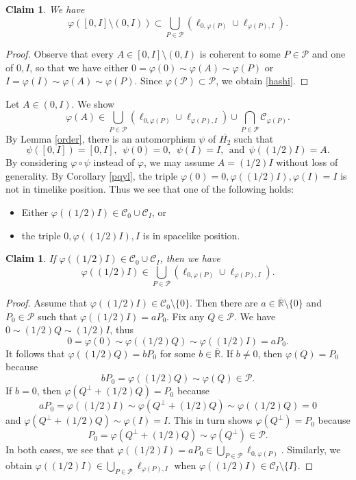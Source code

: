 \documentclass[10pt]{amsart}
\newtheorem{claim}[theorem]{Claim}
\theoremstyle{definition}
\theoremstyle{remark}
\numberwithin{subsection}{section}
\numberwithin{equation}{section}
\newcommand\cC{{\mathcal{C}}}
\newcommand\cP{{\mathcal{P}}}
\newcommand\oH{{\overline{H_2}}}
\newcommand\oR{{\overline{\mathbb{R}}}}
\begin{document}
\begin{claim}
We have
\begin{equation}\label{hashi}
\varphi([0, I]\setminus (0, I))\subset \bigcup_{P\in \cP}(\ell_{0, \varphi(P)}\cup\ell_{\varphi(P),I}).
\end{equation}
\end{claim}
\begin{proof}
Observe that every $A\in [0, I]\setminus (0, I)$ is coherent to some $P\in \cP$ and one of $0, I$, so that we have either $0=\varphi(0)\sim \varphi(A)\sim\varphi(P)$ or $I=\varphi(I)\sim \varphi(A)\sim\varphi(P)$.
Since $\varphi(\cP)\subset \cP$, we obtain \eqref{hashi}.
\end{proof}

Let $A\in (0, I)$. We show 
\[
\varphi(A)\in \bigcup_{P\in \cP}(\ell_{0, \varphi(P)}\cup\ell_{\varphi(P), I}) \cup \bigcap_{P\in \cP} \cC_{\varphi(P)}.
\] 
By Lemma \ref{order}, there is an automorphism $\psi$ of $\oH$ such that 
\[
\psi([0, I])=[0, I],\ \ \psi(0)=0,\ \ \psi(I)=I,\ \  \text{and}\ \ \psi((1/2)I)=A.
\] 
By considering $\varphi\circ\psi$ instead of $\varphi$, we may assume $A=(1/2)I$ without loss of generality.  
By Corollary \ref{pqyl}, the triple $\varphi(0)=0, \varphi((1/2)I), \varphi(I)=I$ is not in timelike position. 
Thus we see that one of the following holds: 
\begin{itemize}
\item Either $\varphi((1/2)I)\in \cC_0\cup \cC_I$, or
\item the triple $0, \varphi((1/2)I), I$ is in spacelike position. 
\end{itemize}


\begin{claim}
If $\varphi((1/2)I)\in \cC_0\cup \cC_I$, then we have
\[
\varphi((1/2)I)\in \bigcup_{P \in \mathcal{P}} \left( \ell_{0, \varphi (P)} \cup \ell_{\varphi (P), I}  \right).
\]
\end{claim}
\begin{proof}
Assume that  $\varphi((1/2)I)\in \cC_0\setminus \{0\}$. 
Then there are $a\in {\oR}\setminus \{0\}$ and $P_0\in \cP$ such that $\varphi((1/2)I)=aP_0$. 
Fix any $Q\in \cP$. 
We have $0\sim (1/2)Q\sim (1/2)I$, thus 
\[
0=\varphi(0)\sim \varphi((1/2)Q)\sim \varphi((1/2)I)=aP_0.
\] 
It follows that $\varphi((1/2)Q)=bP_0$ for some $b\in {\oR}$. 
If $b\neq 0$, then $\varphi(Q)=P_0$ because 
\[
bP_0=\varphi((1/2)Q)\sim \varphi(Q)\in \cP.
\] 
If $b= 0$, then $\varphi(Q^\perp+(1/2)Q)=P_0$ because 
\[
aP_0=\varphi((1/2)I)\sim \varphi(Q^\perp+(1/2)Q)\sim \varphi((1/2)Q)=0
\] 
and $\varphi(Q^\perp+(1/2)Q)\sim \varphi(I)=I$. 
This in turn shows $\varphi(Q^\perp)=P_0$ because 
\[
P_0=\varphi(Q^\perp+(1/2)Q)\sim \varphi(Q^\perp)\in \cP.
\] 
In both cases, we see that $\varphi((1/2)I)=aP_0\in  \bigcup_{P\in \cP}\ell_{0, \varphi(P)}$.
Similarly, we obtain  $\varphi((1/2)I)\in  \bigcup_{P\in \cP}\ell_{\varphi(P), I}$ when $\varphi((1/2)I)\in \cC_I\setminus\{I\}$.
\end{proof}
\end{document}
